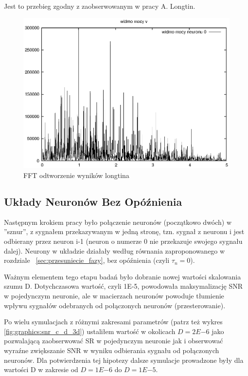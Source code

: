   Jest to przebieg zgodny z zaobserwowanym w pracy A. Longtin.

  \begin{figure}
    \includegraphics[width=140mm]{images/1neuron/3}
    \caption{FFT odtworzenie wyników longtina}
    \label{sym1fft}
  \end{figure}

  
  \subsection{Układy Neuronów Bez Opóźnienia}
  
  Następnym krokiem pracy było połączenie neuronów (początkowo dwóch) w ''sznur'', z sygnałem przekazywanym w jedną stronę, tzn. sygnał z neuronu i jest odbierany przez neuron i-1 (neuron o numerze 0 nie przekazuje swojego sygnału dalej). Neurony w układzie działały według równania zaproponowanego w rozdziale ~\ref{sec:przesuniecie_fazy}, bez opóźnienia (czyli $\tau_{n} = 0$).

  Ważnym elementem tego etapu badań było dobranie nowej wartości skalowania szumu D. Dotychczasowa wartość, czyli 1E-5, powodowała maksymalizację SNR w pojedynczym neuronie, ale w macierzach neuronów powoduje tłumienie wpływu sygnałów odebranych od połączonych neuronów (przesterowanie).

  Po wielu symulacjach z różnymi zakresami parametrów (patrz też wykres \ref{fig:graphics:snr_c_d_3d}) ustaliłem wartość w okolicach $D=2E{-6}$ jako pozwalającą zaobserwować SR w pojedynczym neuronie jak i obserwować wyraźne zwiększanie SNR w wyniku odbierania sygnału od połączonych neuronów. Dla potwierdzenia tej hipotezy dalsze symulacje prowadzone były dla wartości D w zakresie od $D=1E{-6}$ do $D=1E{-5}$.

